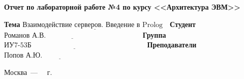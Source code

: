 \documentclass[a4paper,14pt, unknownkeysallowed]{extreport}
\begin{document}
\begin{titlepage}
\begin{center}
    \Large\textbf{Отчет по лабораторной работе №4 по курсу <<Архитектура ЭВМ>>}\newline
\end{center}

\noindent\textbf{Тема} $\underline{\text{Взаимодействие серверов. Введение в Prolog~~}}$\newline\newline
\noindent\textbf{Студент} $\underline{\text{Романов А.В.~~~~~~~~~~~~~~~~~~~~~~~~~~~~~~~~~~~~~~~~}}$\newline\newline
\noindent\textbf{Группа} $\underline{\text{ИУ7-53Б~~~~~~~~~~~~~~~~~~~~~~~~~~~~~~~~~~~~~~~~~~~~~~~~}}$\newline\newline
\noindent\textbf{Преподаватели} $\underline{\text{Попов А.Ю.~~~~~~~~~~~~~~~~~~~~~~~~~~~~~~~}}$\newline

\begin{center}
    \vfill
    Москва~---~\the\year
    ~г.
\end{center}
\restoregeometry
\end{titlepage}
\end{document}
